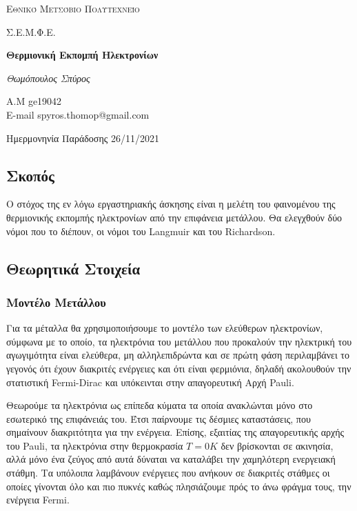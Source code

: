 \documentclass[a4paper]{article}
\begin{document}
\begin{titlepage}			%
	\centering
	{\scshape\LARGE Εθνικό Μετσόβιο Πολυτεχνείο\par}
	{\scshape \LARGE Σ.Ε.Μ.Φ.Ε.\par}
	\vspace{1cm}
	{\huge\bfseries Θερμιονική Εκπομπή Ηλεκτρονίων \par}
	\vspace{1cm}
	{\Large\itshape Θωμόπουλος Σπύρος\par}		%
	
	{\large A.M ge19042 \hfill \\ E-mail spyros.thomop@gmail.com \\}%
	\vspace{1cm}
	{\large Ημερμονηνία Παράδοσης 26/11/2021\par}
\end{titlepage}


\newpage 

\subsection*{Σκοπός}
Ο στόχος της εν λόγω εργαστηριακής άσκησης είναι η μελέτη του φαινομένου της θερμιονικής εκπομπής ηλεκτρονίων από την επιφάνεια μετάλλου. Θα ελεγχθούν δύο νόμοι που το διέπουν, οι νόμοι του Langmuir και του Richardson.

\subsection*{Θεωρητικά Στοιχεία}
\subsubsection*{Μοντέλο Μετάλλου}
Για τα μέταλλα θα χρησιμοποιήσουμε το μοντέλο των ελεύθερων ηλεκτρονίων, σύμφωνα με το οποίο, τα ηλεκτρόνια του μετάλλου που προκαλούν την ηλεκτρική του αγωγιμότητα είναι ελεύθερα, μη αλληλεπιδρώντα και σε πρώτη φάση περιλαμβάνει το γεγονός ότι έχουν διακριτές ενέργειες και ότι είναι φερμιόνια, δηλαδή ακολουθούν την στατιστική Fermi-Dirac και υπόκεινται στην απαγορευτική Αρχή Pauli. 

Θεωρούμε τα ηλεκτρόνια ως επίπεδα κύματα τα οποία ανακλώνται μόνο στο εσωτερικό της επιφάνειάς του. Έτσι παίρνουμε τις δέσμιες καταστάσεις, που σημαίνουν διακριτότητα για την ενέργεια.
Επίσης, εξαιτίας της απαγορευτικής αρχής του Pauli, τα ηλεκτρόνια στην θερμοκρασία $T=0K$ δεν βρίσκονται σε ακινησία, αλλά μόνο ένα ζεύγος από αυτά δύναται να καταλάβει την χαμηλότερη ενεργειακή στάθμη. Τα υπόλοιπα λαμβάνουν ενέργειες που ανήκουν σε διακριτές στάθμες οι οποίες γίνονται όλο και πιο πυκνές καθώς πλησιάζουμε πρός το άνω φράγμα τους, την ενέργεια Fermi. 
\end{document}
